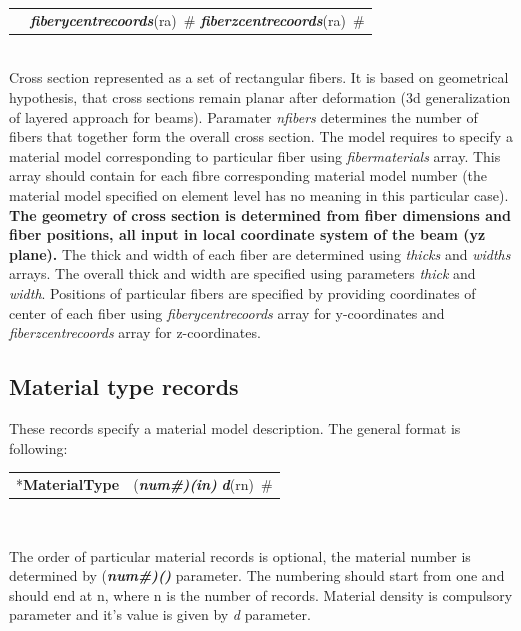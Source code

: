 \documentclass[a4paper]{article}
\makeatletter
\newcommand{\param}[1]{{\em #1}}
\newcommand{\fieldVal}[2]{\mbox{({\it\bf{#1}\#)\tiny (#2)}}}
\newcommand{\keywordnotype}[1]{\mbox{{\it{\bf{#1}}}}}
\newcommand{\keyword}[2]{\mbox{{\keywordnotype{#1}\tiny (#2)}}}
\newcommand{\entKeyword}[1]{\mbox{{*{\bf{#1}}}}}
\newcommand{\entKeywordInst}[1]{\mbox{{\bf{{#1}}}}}
\newcommand{\field}[2]{\mbox{\keyword{#1}{#2}~\#}}
\newenvironment{record}[1][]{\begin{tabular}{|ll}}{\end{tabular}\\}
\newcommand{\recentry}[2]{{#1}&{#2}\\}
\newcounter{rcc}
\newenvironment{record}[1][\textwidth]{\setcounter{rcc}{0}\begin{tabular*}{#1}{|ll@{\extracolsep{\fill}}r}}{\end{tabular*}\\}
\newcommand{\recentry}[2]{\ifthenelse{\value{rcc}>0}{&$\backslash$ \\}{\setcounter{rcc}{1}}{#1}&{#2}}
\makeatother
\begin{document}
\begin{itemize}
\begin{record}[0.9\textwidth]
    \recentry{}{\field{fiberycentrecoords}{ra} \field{fiberzcentrecoords}{ra}}
  \end{record}
  Cross section represented as a set of rectangular fibers. It is based on
geometrical hypothesis, that cross sections remain planar after
deformation (3d generalization of layered approach for beams).
Paramater \param{nfibers} determines the number of fibers that together form the overall cross section.
The model requires to specify a material model corresponding to particular fiber using \param{fibermaterials} array. This array should contain for each fibre corresponding material model number (the material model specified on element level has no meaning in this particular case).
{\bf The geometry of cross section is determined from fiber dimensions and fiber positions, all input in local coordinate system of the beam (yz plane).} The thick and width of each fiber are determined using \param{thicks} and \param{widths} arrays. The overall thick and width are specified using parameters \param{thick} and \param{width}. Positions of particular fibers are specified by providing coordinates of center of each fiber using \param{fiberycentrecoords} array for y-coordinates and \param{fiberzcentrecoords} array for z-coordinates.
\end{itemize}

\subsection{Material type  records}
\label{_MaterialTypeRecords}
These records specify a material model  description. The general format is
following:

\noindent
\begin{record}
  \recentry{\entKeyword{MaterialType}}{\fieldVal{num}{in} \field{d}{rn}}
\end{record}

The order of particular material records is optional, the material number is determined by \fieldVal{num}{} parameter.
The numbering should start from one and should end at n, where n is the number of records.
Material density is compulsory parameter and it's value is given by
\param{d} parameter.
\end{document}
